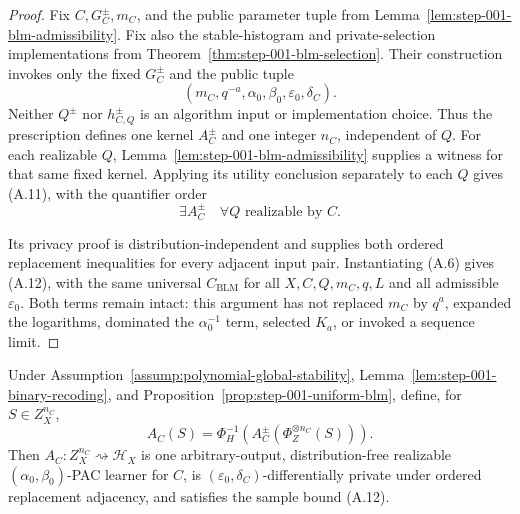 \begin{proof}
Fix \(C,G_C^\pm,m_C\), and the public parameter tuple from
Lemma~\ref{lem:step-001-blm-admissibility}.  Fix also the
stable-histogram and private-selection implementations from
Theorem~\ref{thm:step-001-blm-selection}.  Their construction invokes
only the fixed \(G_C^\pm\) and the public tuple
\[
(m_C,q^{-a},\alpha_0,\beta_0,\varepsilon_0,\delta_C).
\]
Neither \(Q^\pm\) nor \(h_{C,Q}^\pm\) is an algorithm input or
implementation choice.  Thus the prescription defines one kernel
\(A_C^\pm\) and one integer \(n_C\), independent of \(Q\).
For each realizable \(Q\),
Lemma~\ref{lem:step-001-blm-admissibility} supplies a witness for that
same fixed kernel.  Applying its utility conclusion
separately to each \(Q\) gives (A.11), with the quantifier order
\[
\exists A_C^\pm\quad
\forall Q\text{ realizable by }C.
\]

Its privacy proof is distribution-independent and supplies
both ordered replacement inequalities for every adjacent input pair.
Instantiating (A.6) gives (A.12), with the same universal
\(C_{\mathrm{BLM}}\) for all \(X,C,Q,m_C,q,L\) and all admissible
\(\varepsilon_0\).  Both terms remain intact: this argument has not
replaced \(m_C\) by \(q^a\), expanded the logarithms, dominated the
\(\alpha_0^{-1}\) term, selected \(K_a\), or invoked a sequence
limit.
\end{proof}

\begin{proposition}
\label{prop:step-001-binary-private-learner}
Under Assumption~\ref{assump:polynomial-global-stability},
Lemma~\ref{lem:step-001-binary-recoding}, and
Proposition~\ref{prop:step-001-uniform-blm}, define, for
\(S\in Z_X^{n_C}\),
\[
A_C(S)=
\Phi_H^{-1}\!\left(
A_C^\pm(\Phi_Z^{\otimes n_C}(S))
\right).
\tag{A.13}
\]
Then \(A_C:Z_X^{n_C}\rightsquigarrow\mathcal H_X\) is one
arbitrary-output, distribution-free realizable
\((\alpha_0,\beta_0)\)-PAC learner for \(C\), is
\((\varepsilon_0,\delta_C)\)-differentially private under ordered
replacement adjacency, and satisfies the sample bound (A.12).
\end{proposition}

